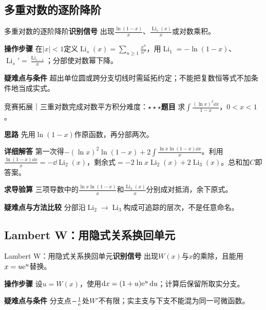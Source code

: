 \subsection{多重对数的逐阶降阶}\label{ic:indefinite_special_complete:polylog}\begin{method}{多重对数的逐阶降阶}\textbf{识别信号} 出现$\frac{\ln(1-x)}{x}$、$\frac{\operatorname{Li}_s(x)}{x}$或对数乘积。\par \textbf{操作步骤} 在$|x|<1$定义$\operatorname{Li}_s(x)=\sum_{n\ge1}\frac{x^n}{n^s}$，用$\operatorname{Li}_1=-\ln(1-x)$、$\operatorname{Li}_s'=\frac{\operatorname{Li}_{s-1}}{x}$；分部使对数幂下降。\par \textbf{疑难点与条件} 超出单位圆或跨分支切线时需延拓约定；不能把复数恒等式不加条件地当成实式。\end{method}

\begin{example}{竞赛拓展｜三重对数完成对数平方积分}{难度：$\star\star\star$}\label{ic:ex:indefinite_special_complete:polylog3}\textbf{题目} 求$\int\frac{(\ln x)^2\dd x}{1-x}$，$0<x<1$。\par \textbf{思路} 先用$\ln(1-x)$作原函数，再分部两次。\par \textbf{详细解答} 第一次得$-(\ln x)^2\ln(1-x)+2\int\frac{\ln x\ln(1-x)\dd x}{x}$。利用$\frac{\ln(1-x)\dd x}{x}=-\dd\operatorname{Li}_2(x)$，剩余式$=-2\ln x\operatorname{Li}_2(x)+2\operatorname{Li}_3(x)$。总和加$C$即答案。\par \textbf{求导验算} 三项导数中的$\frac{\ln x\ln(1-x)}{x}$和$\frac{\operatorname{Li}_2(x)}{x}$分别成对抵消，余下原式。\par \textbf{疑难点与方法比较} 分部沿$\operatorname{Li}_2\to\operatorname{Li}_3$构成可追踪的层次，不是任意命名。\end{example}

\subsection{Lambert W：用隐式关系换回单元}\label{ic:indefinite_special_complete:lambert}\begin{method}{Lambert W：用隐式关系换回单元}\textbf{识别信号} 出现$W(x)$与$x$的乘除，且能用$x=u\mathrm{e}^u$替换。\par \textbf{操作步骤} 设$u=W(x)$，使用$\mathop{}\!\mathrm{d} x=(1+u)\mathrm{e}^u\mathop{}\!\mathrm{d} u$；计算后保留所取实分支。\par \textbf{疑难点与条件} 分支点$-\frac{1}{\mathrm{e}}$处$W'$不有限；实主支与下支不能混为同一可微函数。\end{method}

